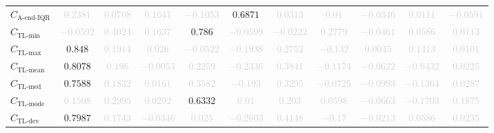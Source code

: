 \documentclass{standalone}
\newcommand{\lastiqrname}{\text{A-end-IQR}}
\newcommand{\lastiqr}{C_{\lastiqrname}}
\newcommand{\tlminname}{\text{TL-min}}
\newcommand{\tlmin}{C_{\tlminname}}
\newcommand{\tlavgname}{\text{TL-mean}}
\newcommand{\tlavg}{C_{\tlavgname}}
\newcommand{\tlmaxname}{\text{TL-max}}
\newcommand{\tlmax}{C_{\tlmaxname}}
\newcommand{\tlmedname}{\text{TL-med}}
\newcommand{\tlmed}{C_{\tlmedname}}
\newcommand{\tlmodename}{\text{TL-mode}}
\newcommand{\tlmode}{C_{\tlmodename}}
\newcommand{\tldevname}{\text{TL-dev}}
\newcommand{\tldev}{C_{\tldevname}}
\begin{document}
\begin{tabular}{lcccccccccc}
$\lastiqr$ & \textcolor{lightgray}{$0.2381$} & \textcolor{lightgray}{$0.0708$} & \textcolor{lightgray}{$0.1641$} & \textcolor{lightgray}{$-0.1053$} & $0.6871$ & \textcolor{lightgray}{$0.0313$} & \textcolor{lightgray}{$0.01$} & \textcolor{lightgray}{$-0.0346$} & \textcolor{lightgray}{$0.0111$} & \textcolor{lightgray}{$-0.0591$} \\ 
$\tlmin$ & \textcolor{lightgray}{$-0.0592$} & \textcolor{lightgray}{$0.4024$} & \textcolor{lightgray}{$0.1637$} & $0.786$ & \textcolor{lightgray}{$-0.0599$} & \textcolor{lightgray}{$-0.0222$} & \textcolor{lightgray}{$0.2779$} & \textcolor{lightgray}{$-0.0461$} & \textcolor{lightgray}{$0.0586$} & \textcolor{lightgray}{$0.0113$} \\ 
$\tlmax$ & $0.848$ & \textcolor{lightgray}{$0.1914$} & \textcolor{lightgray}{$0.026$} & \textcolor{lightgray}{$-0.0522$} & \textcolor{lightgray}{$-0.1938$} & \textcolor{lightgray}{$0.2752$} & \textcolor{lightgray}{$-0.132$} & \textcolor{lightgray}{$0.0045$} & \textcolor{lightgray}{$0.1413$} & \textcolor{lightgray}{$0.0101$} \\ 
$\tlavg$ & $0.8078$ & \textcolor{lightgray}{$0.196$} & \textcolor{lightgray}{$-0.0053$} & \textcolor{lightgray}{$0.2259$} & \textcolor{lightgray}{$-0.2336$} & \textcolor{lightgray}{$0.3841$} & \textcolor{lightgray}{$-0.1174$} & \textcolor{lightgray}{$-0.0622$} & \textcolor{lightgray}{$-0.0432$} & \textcolor{lightgray}{$0.0225$} \\ 
$\tlmed$ & $0.7588$ & \textcolor{lightgray}{$0.1832$} & \textcolor{lightgray}{$0.0161$} & \textcolor{lightgray}{$0.3582$} & \textcolor{lightgray}{$-0.193$} & \textcolor{lightgray}{$0.3295$} & \textcolor{lightgray}{$-0.0725$} & \textcolor{lightgray}{$-0.0993$} & \textcolor{lightgray}{$-0.1364$} & \textcolor{lightgray}{$0.0287$} \\ 
$\tlmode$ & \textcolor{lightgray}{$0.1508$} & \textcolor{lightgray}{$0.2995$} & \textcolor{lightgray}{$0.0292$} & $0.6332$ & \textcolor{lightgray}{$0.01$} & \textcolor{lightgray}{$0.203$} & \textcolor{lightgray}{$0.0598$} & \textcolor{lightgray}{$-0.0663$} & \textcolor{lightgray}{$-0.1703$} & \textcolor{lightgray}{$0.1875$} \\ 
$\tldev$ & $0.7987$ & \textcolor{lightgray}{$0.1743$} & \textcolor{lightgray}{$-0.0346$} & \textcolor{lightgray}{$0.025$} & \textcolor{lightgray}{$-0.2603$} & \textcolor{lightgray}{$0.4148$} & \textcolor{lightgray}{$-0.17$} & \textcolor{lightgray}{$-0.0213$} & \textcolor{lightgray}{$0.0586$} & \textcolor{lightgray}{$0.0235$} \\ 

\end{tabular}
\end{document}
